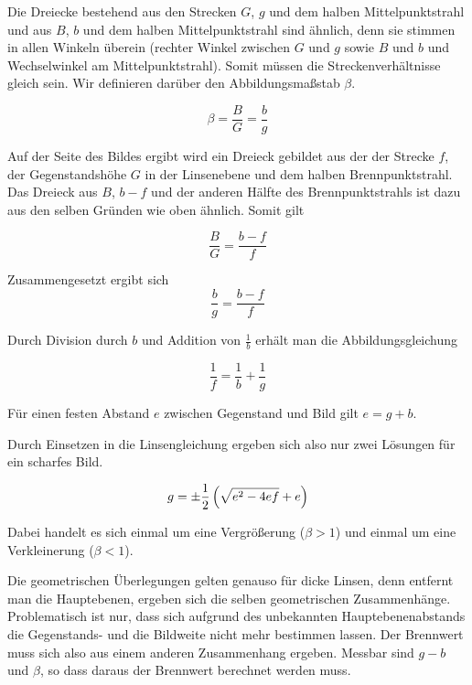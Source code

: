 \documentclass[a4paper,german,12pt,smallheadings]{scrartcl}
\begin{document}
Die Dreiecke bestehend aus den Strecken $G$, $g$ und dem halben
Mittelpunktstrahl und aus $B$, $b$ und dem halben Mittelpunktstrahl sind
ähnlich, denn sie stimmen in allen Winkeln überein (rechter Winkel zwischen $G$
und $g$ sowie $B$ und $b$ und Wechselwinkel am Mittelpunktstrahl). Somit müssen
die Streckenverhältnisse gleich sein. Wir definieren darüber den
Abbildungsmaßstab $\beta$.

\begin{equation}
  \beta = \frac{B}{G} = \frac{b}{g}
  \label{eq:beta}
\end{equation}

Auf der Seite des Bildes ergibt wird ein Dreieck gebildet aus der der Strecke
$f$, der Gegenstandshöhe $G$ in der Linsenebene und dem halben
Brennpunktstrahl. Das Dreieck aus $B$, $b-f$ und der anderen Hälfte des
Brennpunktstrahls ist dazu aus den selben Gründen wie oben ähnlich. Somit gilt

\begin{equation}
  \frac{B}{G} = \frac{b-f}{f}
\end{equation}

Zusammengesetzt ergibt sich
\begin{equation}
  \frac{b}{g} = \frac{b-f}{f}
  \label{eq:inter}
\end{equation}

Durch Division durch $b$ und Addition von $\frac{1}{b}$ erhält man die
Abbildungsgleichung

\begin{equation}
  \frac{1}{f} = \frac{1}{b} + \frac{1}{g}
\end{equation}


Für einen festen Abstand $e$ zwischen Gegenstand und Bild gilt $e = g+b$.

Durch Einsetzen in die Linsengleichung ergeben sich also nur zwei Lösungen für
ein scharfes Bild. %

\begin{equation}
  g = \pm \frac{1}{2} \del{\sqrt{e^2 - 4ef} + e}
\end{equation}

Dabei handelt es sich einmal um eine Vergrößerung ($\beta > 1$) und einmal um
eine Verkleinerung ($\beta < 1$). %

Die geometrischen Überlegungen gelten genauso für dicke Linsen, denn entfernt
man die Hauptebenen, ergeben sich die selben geometrischen Zusammenhänge.
Problematisch ist nur, dass sich aufgrund des unbekannten Hauptebenenabstands
die Gegenstands- und die Bildweite nicht mehr bestimmen lassen. Der Brennwert
muss sich also aus einem anderen Zusammenhang ergeben. Messbar sind $g-b$ und
$\beta$, so dass daraus der Brennwert berechnet werden muss.
\end{document}
